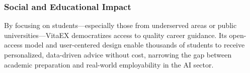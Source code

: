 \documentclass{svproc} %
\begin{document}
	\subsubsection{Social and Educational Impact}
	
	By focusing on students—especially those from underserved areas or public universities—VitaEX democratizes access to quality career guidance. Its open-access model and user-centered design enable thousands of students to receive personalized, data-driven advice without cost, narrowing the gap between academic preparation and real-world employability in the AI sector.
	
\makeatletter
\renewcommand\@biblabel[1]{#1.}  %
\renewcommand\bibsection{\section*{References}\vspace*{-0.5em}} %
\makeatother

	
	
\end{document}
